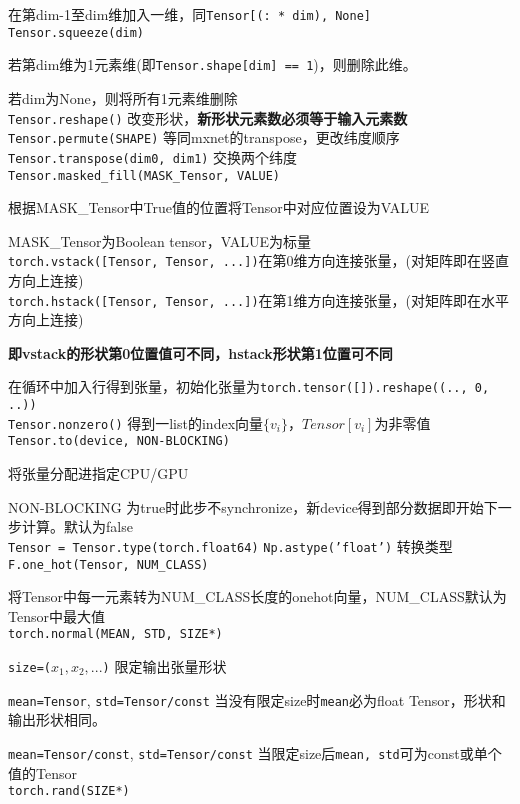 \documentclass[UTF8]{ctexart}
\begin{document}
  在第dim-1至dim维加入一维，同\texttt{Tensor[(: * dim), None]}\\
\texttt{Tensor.squeeze(dim)}

  若第dim维为1元素维(即\texttt{Tensor.shape[dim] == 1})，则删除此维。

  若dim为None，则将所有1元素维删除\\
\texttt{Tensor.reshape()} 改变形状，\textbf{新形状元素数必须等于输入元素数}\\
\texttt{Tensor.permute(SHAPE)} 等同mxnet的transpose，更改纬度顺序\\
\texttt{Tensor.transpose(dim0, dim1)} 交换两个纬度\\
\texttt{Tensor.masked\_fill(MASK\_Tensor, VALUE)}

  根据MASK\_Tensor中True值的位置将Tensor中对应位置设为VALUE

  MASK\_Tensor为Boolean tensor，VALUE为标量\\
\texttt{torch.vstack([Tensor, Tensor, ...])}在第0维方向连接张量，(对矩阵即在竖直方向上连接)\\
\texttt{torch.hstack([Tensor, Tensor, ...])}在第1维方向连接张量，(对矩阵即在水平方向上连接)

  \textbf{即vstack的形状第0位置值可不同，hstack形状第1位置可不同}

  在循环中加入行得到张量，初始化张量为\texttt{torch.tensor([]).reshape((.., 0, ..))}\\
\texttt{Tensor.nonzero()} 得到一list的index向量$\{v_i\}$，$Tensor[v_i]$为非零值\\
\texttt{Tensor.to(device, NON-BLOCKING)} 

  将张量分配进指定CPU/GPU
  
  NON-BLOCKING 为true时此步不synchronize，新device得到部分数据即开始下一步计算。默认为false\\
\texttt{Tensor = Tensor.type(torch.float64)} \texttt{Np.astype('float')} 转换类型\\
\texttt{F.one\_hot(Tensor, NUM\_CLASS)} 

  将Tensor中每一元素转为NUM\_CLASS长度的onehot向量，NUM\_CLASS默认为Tensor中最大值\\
\texttt{torch.normal(MEAN, STD, SIZE*)}

  \texttt{size=($x_1, x_2, ...$)} 限定输出张量形状

  \texttt{mean=Tensor}, \texttt{std=Tensor/const} 当没有限定size时\texttt{mean}必为float Tensor，形状和输出形状相同。

  \texttt{mean=Tensor/const}, \texttt{std=Tensor/const} 当限定size后\texttt{mean, std}可为const或单个值的Tensor\\
\texttt{torch.rand(SIZE*)}
\end{document}
